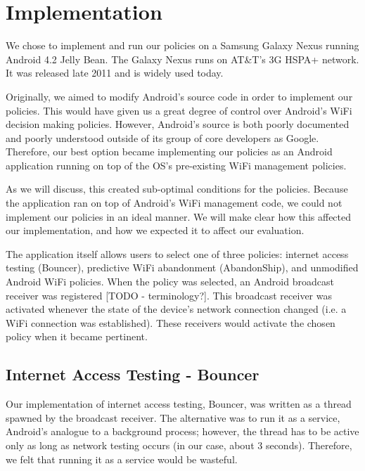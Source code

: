 \section{Implementation}
\label{sec:impl}

We chose to implement and run our policies on a Samsung Galaxy Nexus running Android 4.2 Jelly Bean. The Galaxy Nexus runs on AT\&T's 3G HSPA+ network. It was released late 2011 and is widely used today.

Originally, we aimed to modify Android's source code in order to implement our policies. This would have given us a great degree of control over Android's WiFi decision making policies. However, Android's source is both poorly documented and poorly understood outside of its group of core developers as Google. Therefore, our best option became implementing our policies as an Android application running on top of the OS's pre-existing WiFi management policies.

As we will discuss, this created sub-optimal conditions for the policies. Because the application ran on top of Android's WiFi management code, we could not implement our policies in an ideal manner. We will make clear how this affected our implementation, and how we expected it to affect our evaluation.

The application itself allows users to select one of three policies: internet access testing (Bouncer), predictive WiFi abandonment (AbandonShip), and unmodified Android WiFi policies. When the policy was selected, an Android broadcast receiver was registered [TODO - terminology?]. This broadcast receiver was activated whenever the state of the device's network connection changed (i.e. a WiFi connection was established). These receivers would activate the chosen policy when it became pertinent.


\subsection{Internet Access Testing - Bouncer}
Our implementation of internet access testing, Bouncer, was written as a thread spawned by the broadcast receiver. The alternative was to run it as a service, Android's analogue to a background process; however, the thread has to be active only as long as network testing occurs (in our case, about 3 seconds). Therefore, we felt that running it as a service would be wasteful.

